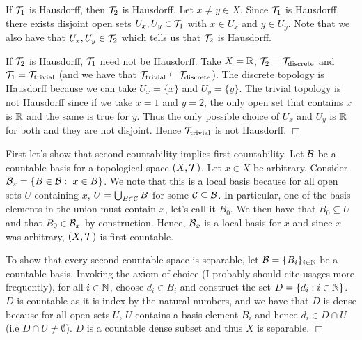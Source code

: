 \documentclass{article}
\begin{document}
 {
    If $\mathcal{T}_{1}$ is Hausdorff, then $\mathcal{T}_{2}$ is Hausdorff. Let $x\neq y\in X$. Since $\mathcal{T}_{1}$ is Hausdorff, there exists disjoint open sets $U_{x},U_{y}\in \mathcal{T}_{1}$ with $x\in U_{x}$ and $y\in U_{y}$. Note that we also have that $U_{x}, U_{y}\in \mathcal{T}_{2}$ which tells us that $\mathcal{T}_{2}$ is Hausdorff.

    If $\mathcal{T}_{2}$ is Hausdorff, $\mathcal{T}_{1}$ need not be Hausdorff. Take $X = \mathbb{R}$, $\mathcal{T}_{2} = \mathcal{T}_{\text{discrete}}$ and $\mathcal{T}_{1} = \mathcal{T}_{\text{trivial}}$ (and we have that $\mathcal{T}_{\text{trivial}}\subseteq \mathcal{T}_{\text{discrete}}$). The discrete topology is Hausdorff because we can take $U_{x} = \{x\}$ and $U_{y} = \{y\}$. The trivial topology is not Hausdorff since if we take $x = 1$ and $y = 2$, the only open set that contains $x$ is $\mathbb{R}$ and the same is true for $y$. Thus the only possible choice of $U_{x}$ and $U_{y}$ is $\mathbb{R}$ for both and they are not disjoint. Hence $\mathcal{T}_{\text{trivial}}$ is not Hausdorff. $\Box$
}

 {
    First let's show that second countability implies first countability. Let $\mathcal{B}$ be a countable basis for a topological space $(X, \mathcal{T})$. Let $x\in X$ be arbitrary. Consider $\cb_{x} = \{B\in \cb:\ x\in B\}$. We note that this is a local basis because for all open sets $U$ containing $x$, $U = \bigcup_{B\in \mathcal{C}} B$ for some $\mathcal{C}\subseteq \mathcal{B}$. In particular, one of the basis elements in the union must contain $x$, let's call it $B_{0}$. We then have that $B_{0}\subseteq U$ and that $B_{0}\in \mathcal{B}_{x}$ by construction. Hence, $\mathcal{B}_{x}$ is a local basis for $x$ and since $x$ was arbitrary, $(X,\mathcal{T})$ is first countable.

    To show that every second countable space is separable, let $\mathcal{B} = \{B_{i}\}_{i\in\mathbb{N}}$ be a countable basis. Invoking the axiom of choice (I probably should cite usages more frequently), for all $i\in \mathbb{N}$, choose $d_{i}\in B_{i}$ and construct the set $D = \{d_{i}:i\in \mathbb{N}\}$. $D$ is countable as it is index by the natural numbers, and we have that $D$ is dense because for all open sets $U$, $U$ contains a basis element $B_{i}$ and hence $d_{i}\in D\cap U$ (i.e $D\cap U\neq \emptyset$). $D$ is a countable dense subset and thus $X$ is separable. $\Box$ 
}
\end{document}
